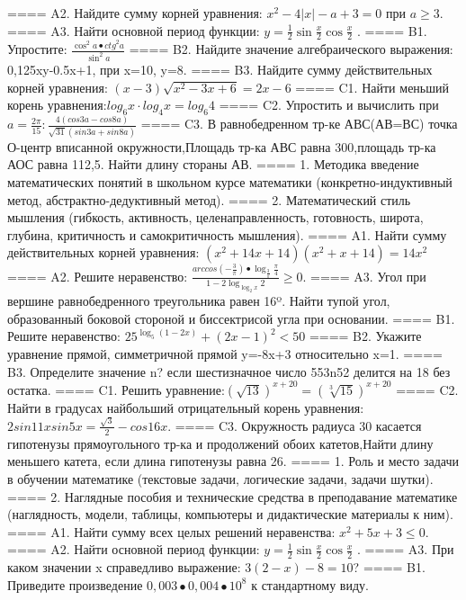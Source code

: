====
A2. Найдите сумму корней уравнения: \(x^{2} - 4|x| - a + 3 = 0\) при \(a \geq 3\).
====
A3. Найти основной период функции: \(y = \frac{1}{2}\sin{\frac{x}{2}\cos\frac{x}{2}}\) .
====
B1. Упростите: \(\frac{\cos^{2}a \bullet {ctg}^{2}a}{\sin^{2}a}\)
====
B2. Найдите значение алгебраического выражения: 0,125xy-0.5x+1, при x=10, y=8.
====
B3. Найдите сумму действительных корней уравнения: \((x - 3)\sqrt{x^{2} - 3x + 6} = 2x - 6\)
====
C1. Найти меньший корень уравнения:\(log_{6}x \cdot log_{4}x = log_{6}4\)
====
C2. Упростить и вычислить при \(a = \frac{2\pi}{15}:\frac{4(cos3a - cos8a)}{\sqrt{31}(sin3a + sin8a)}\)
====
C3. В равнобедренном тр-ке АВС(АВ=ВС) точка О-центр вписанной окружности,Площадь тр-ка АВС равна 300,площадь тр-ка АОС равна 112,5. Найти длину стораны АВ.
====
1. Методика введение математических понятий в школьном курсе математики (конкретно-индуктивный метод, абстрактно-дедуктивный метод).
====
2. Математический стиль мышления (гибкость, активность, целенаправленность, готовность, широта, глубина, критичность и самокритичность мышления).
====
A1. Найти сумму действительных корней уравнения: \((x^{2} + 14x + 14)(x^{2} + x + 14) = 14x^{2}\)
====
A2. Решите неравенство: \(\frac{arccos( - \frac{3}{\pi}) \bullet \log_{\frac{3}{\pi}}\frac{\pi}{4}}{1 - 2\log_{\log_{2}x}2} \geq 0\).
====
A3. Угол при вершине равнобедренного треугольника равен 16º. Найти тупой угол, образованный боковой стороной и биссектрисой угла при основании.
====
B1. Решите неравенство: \(25^{\log_{5}{(1 - 2x)}} + {(2x - 1)}^{2} < 50\)
====
B2. Укажите уравнение прямой, симметричной прямой y=-8x+3 относительно x=1.
====
B3. Определите значение n? если шестизначное число 553n52 делится на 18 без остатка.
====
C1. Решить уравнение:\((\sqrt{13})^{x + 20} = (\sqrt[3]{15})^{x + 20}\)
====
C2. Найти в градусах найбольший отрицательный корень уравнения: \(2sin11xsin5x = \frac{\sqrt{3}}{2} - cos16x\).
====
C3. Окружность радиуса 30 касается гипотенузы прямоугольного тр-ка и продолжений обоих катетов,Найти длину меньшего катета, если длина гипотенузы равна 26.
====
1. Роль и место задачи в обучении математике (текстовые задачи, логические задачи, задачи шутки).
====
2. Наглядные пособия и технические средства в преподавание математике (наглядность, модели, таблицы, компьютеры и дидактические материалы к ним).
====
A1. Найти сумму всех целых решений неравенства: \(x^{2} + 5x + 3 \leq 0\).
====
A2. Найти основной период функции: \(y = \frac{1}{2}\sin{\frac{x}{2}\cos\frac{x}{2}}\) .
====
A3. При каком значении x справедливо выражение: \(3(2 - x) - 8 = 10\)?
====
B1. Приведите произведение \(0,003 \bullet 0,004 \bullet 10^{8}\) к стандартному виду.
